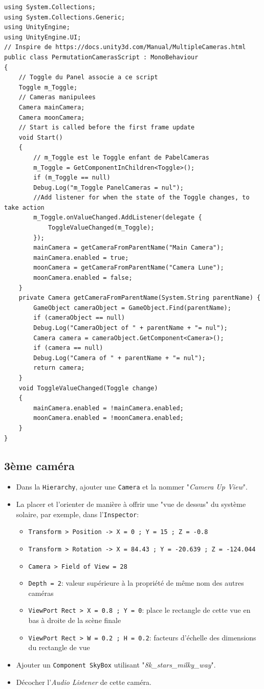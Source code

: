 \documentclass[a4paper,10pt]{article}
\newenvironment{solution}%
{\begin{tcolorbox}[breakable,colback=red!5!white,colframe=red!75!black,title=Solution]}%
{\end{tcolorbox}}
\begin{document}
\begin{solution}
\begin{lstlisting}
using System.Collections;
using System.Collections.Generic;
using UnityEngine;
using UnityEngine.UI;
// Inspire de https://docs.unity3d.com/Manual/MultipleCameras.html
public class PermutationCamerasScript : MonoBehaviour
{
	// Toggle du Panel associe a ce script
	Toggle m_Toggle;
	// Cameras manipulees
	Camera mainCamera;
	Camera moonCamera;
	// Start is called before the first frame update
	void Start()
	{
		// m_Toggle est le Toggle enfant de PabelCameras
		m_Toggle = GetComponentInChildren<Toggle>();
		if (m_Toggle == null)
		Debug.Log("m_Toggle PanelCameras = nul");
		//Add listener for when the state of the Toggle changes, to take action
		m_Toggle.onValueChanged.AddListener(delegate {
			ToggleValueChanged(m_Toggle);
		});
		mainCamera = getCameraFromParentName("Main Camera");
		mainCamera.enabled = true;
		moonCamera = getCameraFromParentName("Camera Lune");
		moonCamera.enabled = false;
	}
	private Camera getCameraFromParentName(System.String parentName) {
		GameObject cameraObject = GameObject.Find(parentName);
		if (cameraObject == null)
		Debug.Log("CameraObject of " + parentName + "= nul");
		Camera camera = cameraObject.GetComponent<Camera>();
		if (camera == null)
		Debug.Log("Camera of " + parentName + "= nul");
		return camera;
	}
	void ToggleValueChanged(Toggle change)
	{
		mainCamera.enabled = !mainCamera.enabled;
		moonCamera.enabled = !moonCamera.enabled;
	}
}	
\end{lstlisting}
	
	\subsection{3ème caméra}
\begin{itemize}
	\item Dans la \texttt{Hierarchy}, ajouter une \texttt{Camera} et la nommer "\textit{Camera Up View}".
	\item La placer et l'orienter de manière à offrir une "vue de dessus" du système solaire, par exemple, dans l'\texttt{Inspector}:
	\begin{itemize}
		\item \texttt{Transform > Position -> X = 0 ; Y = 15 ; Z = -0.8}
		\item \texttt{Transform > Rotation -> X = 84.43 ; Y = -20.639 ; Z = -124.044}
		\item \texttt{Camera > Field of View = 28}
		\item \texttt{Depth = 2}: valeur supérieure à la propriété de même nom des autres caméras 
		\item \texttt{ViewPort Rect > X = 0.8 ; Y = 0}: place le rectangle de cette vue en bas à droite de la scène finale
		\item \texttt{ViewPort Rect > W = 0.2 ; H = 0.2}: facteurs d'échelle des dimensions du rectangle de vue
	\end{itemize}
	\item Ajouter un \texttt{Component SkyBox} utilisant "\textit{8k\_stars\_milky\_way}".
	\item Décocher l'\textit{Audio Listener} de cette caméra.
\end{itemize}	
\end{solution}
\end{document}
